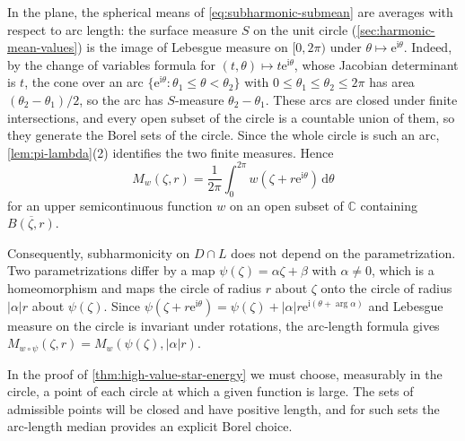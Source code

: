 In the plane, the spherical means of \eqref{eq:subharmonic-submean} are averages with respect to arc length: the surface measure $S$ on the unit circle (\cref{sec:harmonic-mean-values}) is the image of Lebesgue measure on $[0,2\pi)$ under $\theta\mapsto\mathrm e^{\mathrm i\theta}$. Indeed, by the change of variables formula for $(t,\theta)\mapsto t\mathrm e^{\mathrm i\theta}$, whose Jacobian determinant is $t$, the cone over an arc $\{\mathrm e^{\mathrm i\theta}:\theta_1\leq\theta<\theta_2\}$ with $0\leq\theta_1\leq\theta_2\leq2\pi$ has area $(\theta_2-\theta_1)/2$, so the arc has $S$-measure $\theta_2-\theta_1$. These arcs are closed under finite intersections, and every open subset of the circle is a countable union of them, so they generate the Borel sets of the circle. Since the whole circle is such an arc, \cref{lem:pi-lambda}(2) identifies the two finite measures. Hence
\[
 M_w(\zeta,r)=\frac1{2\pi}\int_0^{2\pi}w(\zeta+r\mathrm e^{\mathrm i\theta})\,\mathrm d\theta
\]
for an upper semicontinuous function $w$ on an open subset of $\mathbb C$ containing $\overline{B(\zeta,r)}$.

Consequently, subharmonicity on $D\cap L$ does not depend on the parametrization. Two parametrizations differ by a map $\psi(\zeta)=\alpha\zeta+\beta$ with $\alpha\neq0$, which is a homeomorphism and maps the circle of radius $r$ about $\zeta$ onto the circle of radius $|\alpha|r$ about $\psi(\zeta)$. Since $\psi(\zeta+r\mathrm e^{\mathrm i\theta})=\psi(\zeta)+|\alpha|r\mathrm e^{\mathrm i(\theta+\arg\alpha)}$ and Lebesgue measure on the circle is invariant under rotations, the arc-length formula gives $M_{w\circ\psi}(\zeta,r)=M_w(\psi(\zeta),|\alpha|r)$.

In the proof of \cref{thm:high-value-star-energy} we must choose, measurably in the circle, a point of each circle at which a given function is large. The sets of admissible points will be closed and have positive length, and for such sets the arc-length median provides an explicit Borel choice.


